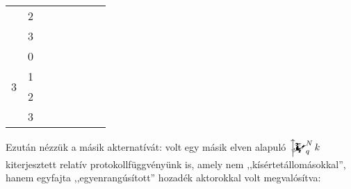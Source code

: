 \documentclass{article}
\newcommand{\blk}{\cellcolor{darkgray}}
\newcommand{\red}{\cellcolor{red!33}}
\newcommand{\grn}{\cellcolor{green!33}}
\newcommand{\ylw}{\cellcolor{yellow}}
\newcommand{\nothing}{\text{\raisebox{0.4em}{\rotatebox{180}{$\curvearrowleft$}}}}%
\newcommand{\just}[1]{\boxed{#1}}%
\newcommand{\incl}{\mathbf{incl}}
\newcommand{\excl}{\mathbf{excl}}
\newcommand{\mainfunext}[3]{\left\uparrow\!\!\!\mathwitch*_{#2}^{#1}#3\right.}
\begin{document}
\begin{table}[H]
\begin{tabular}{c|c|c|c|c|c|c|c|}
				               &  2                        &    \blk           & \blk           & \red\just\excl & \grn\just\incl & \blk           & \blk           \\\cline{2-8}
				               &  3                        &    \ylw           & \ylw           & \ylw\nothing   & \ylw\nothing   & \ylw           & \ylw           \\\hline\hline
			\multirow{4}{*}{3}     &  0                        &    \blk           & \blk           & \blk           & \blk           & \blk           & \blk           \\\cline{2-8}
				               &  1                        &    \ylw           & \ylw           & \ylw           & \ylw           & \ylw           & \ylw           \\\cline{2-8}
				               &  2                        &    \blk           & \blk           & \blk           & \blk           & \blk           & \blk           \\\cline{2-8}
				               &  3                        &    \ylw           & \ylw           & \ylw           & \ylw           & \ylw           & \ylw           \\\hline
		\end{tabular}
	\end{table}

	Ezután nézzük a másik akternatívát: volt egy másik elven alapuló $\mainfunext Nqk$ kiterjesztett relatív protokollfüggvényünk is, amely nem ,,kísértetállomásokkal'', hanem egyfajta ,,egyenrangúsított'' hozadék aktorokkal volt megvalósítva:
	 
\end{document}
